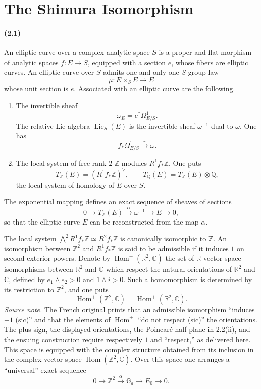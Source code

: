 \documentclass[10pt]{article}
\newcommand{\C}{\mathbb C}
\newcommand{\Q}{\mathbb Q}
\newcommand{\R}{\mathbb R}
\newcommand{\Z}{\mathbb Z}
\newcommand{\Ga}{\mathbb G_a}
\newcommand{\Hom}{\operatorname{Hom}}
\newcommand{\Lie}{\operatorname{Lie}}
\begin{document}
\section{The Shimura Isomorphism}

\paragraph{(2.1)}
An elliptic curve over a complex analytic space $S$ is a proper and flat morphism of
analytic spaces $f:E\to S$, equipped with a section $e$, whose fibers are elliptic curves.
An elliptic curve over $S$ admits one and only one $S$-group law
\[
\mu:E\times_S E\to E
\]
whose unit section is $e$. Associated with an elliptic curve are the following.

\begin{enumerate}[label=(\alph*)]
\item The invertible sheaf
\[
\omega_E=e^*\Omega^1_{E/S}.
\]
The relative Lie algebra $\Lie_S(E)$ is the invertible sheaf $\omega^{-1}$ dual to $\omega$.
One has
\[
f_*\Omega^1_{E/S}\xrightarrow{\sim}\omega .
\]

\item The local system of free rank-$2$ $\Z$-modules $R^1f_*\Z$. One puts
\[
T_\Z(E)=(R^1f_*\Z)^\vee,\qquad
T_\Q(E)=T_\Z(E)\otimes\Q,
\]
the local system of homology of $E$ over $S$.
\end{enumerate}

The exponential mapping defines an exact sequence of sheaves of sections
\[
0\longrightarrow T_\Z(E)\xrightarrow{\alpha}\omega^{-1}\longrightarrow E\longrightarrow 0,
\]
so that the elliptic curve $E$ can be reconstructed from the map $\alpha$.

The local system $\bigwedge^2 R^1f_*\Z\simeq R^2f_*\Z$ is canonically isomorphic
to $\Z$. An isomorphism between $\Z^2$ and $R^1f_*\Z$ is said to be admissible if it
induces $1$ on second exterior powers. Denote by $\Hom^+(\R^2,\C)$ the set of
$\R$-vector-space isomorphisms between $\R^2$ and $\C$ which respect the natural
orientations of $\R^2$ and $\C$, defined by $e_1\wedge e_2>0$ and $1\wedge i>0$.
Such a homomorphism is determined by its restriction to $\Z^2$, and one puts
\[
\Hom^+(\Z^2,\C)=\Hom^+(\R^2,\C).
\]
\noindent\emph{Source note.} The French original prints that an admissible isomorphism
``induces $-1$ (sic)'' and that the elements of $\Hom^+$ ``do not respect (sic)'' the
orientations. The plus sign, the displayed orientations, the Poincaré half-plane in 2.2(ii),
and the ensuing construction require respectively $1$ and ``respect,'' as delivered here.
This space is equipped with the complex structure obtained from its inclusion in the
complex vector space $\Hom(\Z^2,\C)$. Over this space one arranges a ``universal'' exact
sequence
\[
0\longrightarrow \Z^2\xrightarrow{\alpha}\Ga\longrightarrow E_0\longrightarrow 0.
\]
\end{document}

